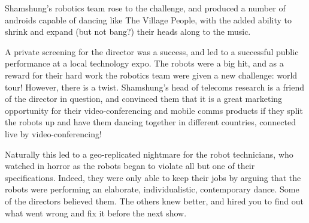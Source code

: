 \documentclass[a4paper]{article}
\begin{document}
Shamshung's robotics team rose to the challenge, and produced a number of
androids capable of dancing like The Village People, with the added
ability to shrink and expand (but not bang?) their heads along to the music.

A private screening for the director was a success, and led to a successful
public performance at a local technology expo. The robots were a big hit, and
as a reward for their hard work the robotics team were given a new challenge:
world tour! However, there is a twist. Shamshung's head of telecoms research
is a friend of the director in question, and convinced them that it is a great
marketing opportunity for their video-conferencing and mobile comms products
if they split the robots up and have them dancing together in different
countries, connected live by video-conferencing!

Naturally this led to a geo-replicated nightmare for the robot technicians,
who watched in horror as the robots began to violate all but one of their
specifications. Indeed, they were only able to keep their jobs by arguing that
the robots were performing an elaborate, individualistic, contemporary dance.
Some of the directors believed them. The others knew better, and hired you to
find out what went wrong and fix it before the next show.


%
%
\end{document}
